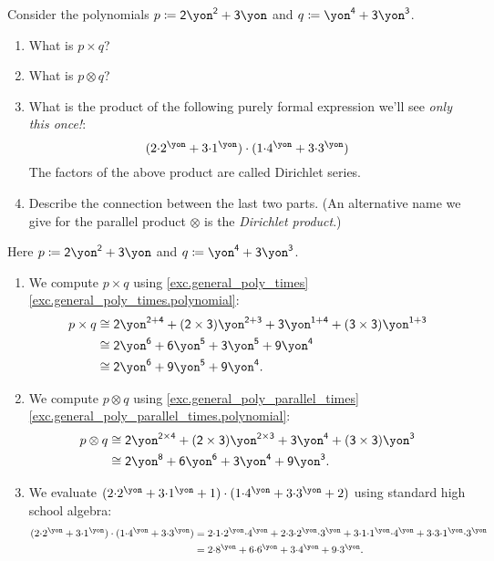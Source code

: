 \documentclass[Book-Poly]{subfiles}
\begin{document}
\begin{exercise}
Consider the polynomials $p\coloneqq \2\yon^\2+\3\yon$ and $q\coloneqq\yon^\4+\3\yon^\3$.
\begin{enumerate}
	\item What is $p\times q$?
	\item What is $p\otimes q$?
	\item What is the product of the following purely formal expression we'll see \emph{only this once!}:
	\[
	(2\mdot2^\yon+3\mdot 1^\yon) \cdot 
	(1\mdot4^\yon+3\mdot 3^\yon)
	\]
    The factors of the above product are called Dirichlet series.
	\item Describe the connection between the last two parts. (An alternative name we give for the parallel product $\otimes$ is the \emph{Dirichlet product}.) \qedhere
\end{enumerate}
\begin{solution}
Here $p\coloneqq \2\yon^\2+\3\yon$ and $q\coloneqq\yon^\4+\3\yon^\3$.
\begin{enumerate}
    \item We compute $p \times q$ using \cref{exc.general_poly_times} \cref{exc.general_poly_times.polynomial}:
    \begin{align*}
        p \times q &\iso \2\yon^{\2 + \4} + (\2 \times \3)\yon^{\2 + \3} + \3\yon^{\1 + \4} + (\3 \times \3)\yon^{\1 + \3} \\
        &\iso \2\yon^\6 + \6\yon^\5 + \3\yon^\5 + \9\yon^\4 \\
        &\iso \2\yon^\6 + \9\yon^\5 + \9\yon^\4.
    \end{align*}
    
    \item We compute $p \otimes q$ using \cref{exc.general_poly_parallel_times} \cref{exc.general_poly_parallel_times.polynomial}:
    \begin{align*}
        p \otimes q &\iso \2\yon^{\2 \times \4} + (\2 \times \3)\yon^{\2 \times \3} + \3\yon^\4 + (\3 \times \3)\yon^\3 \\
        &\iso \2\yon^\8 + \6\yon^\6 + \3\yon^\4 + \9\yon^\3.
    \end{align*}
    
    \item We evaluate $(2\mdot2^\yon+3\mdot 1^\yon+1) \cdot 
	(1\mdot4^\yon+3\mdot 3^\yon+2)$ using standard high school algebra:
    \begin{align*}
	    (2\mdot2^\yon+3\mdot 1^\yon) \cdot (1\mdot4^\yon+3\mdot 3^\yon) &= 2\mdot1\mdot2^\yon\mdot4^\yon + 2\mdot3\mdot2^\yon\mdot3^\yon + 3\mdot1\mdot1^\yon\mdot4^\yon + 3\mdot3\mdot1^\yon\mdot3^\yon \\
	    &= 2\mdot8^\yon + 6\mdot6^\yon + 3\mdot4^\yon + 9\mdot3^\yon.
	\end{align*}
	

\end{enumerate}
\end{solution}
\end{exercise}
\end{document}

